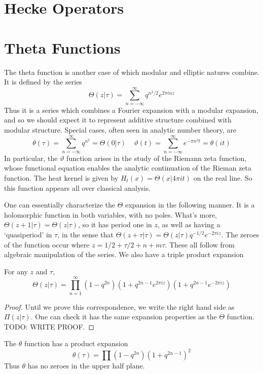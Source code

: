 \section{Hecke Operators}

\section{Theta Functions}

The theta function is another case of which modular and elliptic natures combine. It is defined by the series
%
\[ \Theta(z|\tau) = \sum_{n = -\infty}^\infty q^{n^2/2} e^{2 \pi i n z} \]
%
Thus it is a series which combines a Fourier expansion with a modular expansion, and so we should expect it to represent additive structure combined with modular structure. Special cases, often seen in analytic number theory, are
%
\[ \theta(\tau) = \sum_{n = -\infty}^\infty q^{n^2} = \Theta(0|\tau)\ \ \ \ \ \vartheta(t) = \sum_{n = -\infty}^\infty e^{- \pi n^2 t} = \theta(it) \]
%
In particular, the $\vartheta$ function arises in the study of the Riemann zeta function, whose functional equation enables the analytic continuation of the Rieman zeta function. The heat kernel is given by $H_t(x) = \Theta(x|4 \pi i t)$ on the real line. So this function appears all over classical analysis.

One can essentially characterize the $\Theta$ expansion in the following manner. It is a holomorphic function in both variables, with no poles. What's more, $\Theta(z + 1|\tau) = \Theta(z|\tau)$, so it has period one in $z$, as well as having a `quasiperiod' in $\tau$, in the sense that $\Theta(z + \tau|\tau) = \Theta(z|\tau) q^{-1/2} e^{-2 \pi i z}$. The zeroes of the function occur where $z = 1/2 + \tau/2 + n + m \tau$. These all follow from algebraic manipulation of the series. We also have a triple product expansion

\begin{theorem}
    For any $z$ and $\tau$,
\[ \Theta(z|\tau) = \prod_{n = 1}^\infty (1 - q^{2n})(1 + q^{2n-1} e^{2 \pi i z})(1 + q^{2n-1} e^{-2 \pi i z}) \]
\end{theorem}
\begin{proof}
    Until we prove this correspondence, we write the right hand side as $\Pi(z|\tau)$. One can check it has the same expansion properties as the $\Theta$ function. TODO: WRITE PROOF.
\end{proof}

\begin{corollary}
    The $\theta$ function has a product expansion
    \[ \theta(\tau) = \prod (1 - q^{2n})(1 + q^{2n-1})^2 \]
    Thus $\theta$ has no zeroes in the upper half plane.
\end{corollary}

